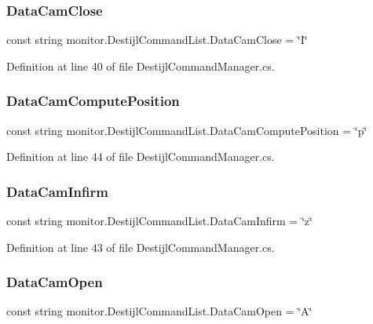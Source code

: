 \subsubsection{Data\+Cam\+Close}
{\footnotesize\ttfamily const string monitor.\+Destijl\+Command\+List.\+Data\+Cam\+Close = \char`\"{}I\char`\"{}}



Definition at line 40 of file Destijl\+Command\+Manager.\+cs.

\mbox{\label{classmonitor_1_1_destijl_command_list_ab114adce60b63976d8304f2ad11b317a}} 
\subsubsection{Data\+Cam\+Compute\+Position}
{\footnotesize\ttfamily const string monitor.\+Destijl\+Command\+List.\+Data\+Cam\+Compute\+Position = \char`\"{}p\char`\"{}}



Definition at line 44 of file Destijl\+Command\+Manager.\+cs.

\mbox{\label{classmonitor_1_1_destijl_command_list_ad3985694a06148f2014cb346e8891cba}} 
\subsubsection{Data\+Cam\+Infirm}
{\footnotesize\ttfamily const string monitor.\+Destijl\+Command\+List.\+Data\+Cam\+Infirm = \char`\"{}z\char`\"{}}



Definition at line 43 of file Destijl\+Command\+Manager.\+cs.

\mbox{\label{classmonitor_1_1_destijl_command_list_a6380d1518931373bd0dfb84f888942e0}} 
\subsubsection{Data\+Cam\+Open}
{\footnotesize\ttfamily const string monitor.\+Destijl\+Command\+List.\+Data\+Cam\+Open = \char`\"{}A\char`\"{}}



